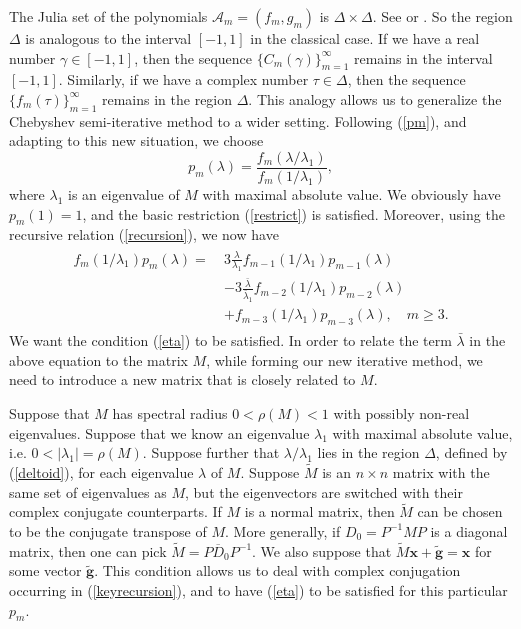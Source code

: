 \documentclass[reqno]{amsart}
\newcommand{\mb}{\mathbf}
\numberwithin{equation}{section}
\theoremstyle{plain}
\theoremstyle{definition}
\begin{document}
The Julia set of the polynomials $\mathcal{A}_m=(f_m,g_m)$ is $\Delta\times \Delta$. See \cite{veselov} or \cite{veselov-survey}. So the region $\Delta$ is analogous to the interval $[-1,1]$ in the classical case. If we have a real number $\gamma\in [-1,1]$, then the sequence $\{C_m(\gamma)\}_{m=1}^\infty$ remains in the interval $[-1,1]$. Similarly, if we have a complex number $\tau\in\Delta$, then the sequence $\{f_m(\tau)\}_{m=1}^\infty$ remains in the region $\Delta$. This analogy allows us to generalize the Chebyshev semi-iterative method to a wider setting. Following (\ref{pm}), and adapting to this new situation, we choose
\[p_m(\lambda) = \frac{f_m(\lambda/\lambda_1)}{f_m(1/\lambda_1)},\]
where $\lambda_1$ is an eigenvalue of $M$ with maximal absolute value. We obviously have $p_m(1)=1$, and the basic restriction (\ref{restrict}) is satisfied. Moreover, using the recursive relation (\ref{recursion}), we now have
\begin{align}\label{keyrecursion}
	\begin{split}	
		f_m(1/\lambda_1)p_m(\lambda) =\ & 3 \frac{\lambda}{\lambda_1} f_{m-1}(1/\lambda_1)p_{m-1}(\lambda)\\
		&-3\frac{\bar{\lambda}}{\bar{\lambda}_1} f_{m-2}(1/\lambda_1)p_{m-2}(\lambda)\\
		&+f_{m-3}(1/\lambda_1)p_{m-3}(\lambda), \quad m\geq 3.
	\end{split}	
\end{align}
We want the condition (\ref{eta}) to be satisfied. In order to relate the term $\bar{\lambda}$ in the above equation to the matrix $M$, while forming our new iterative method, we need to introduce a new matrix that is closely related to $M$.

Suppose that $M$ has spectral radius $0<\rho(M)<1$ with possibly non-real eigenvalues. Suppose that we know an eigenvalue $\lambda_1$ with maximal absolute value, i.e. $0<|\lambda_1|=\rho(M)$. Suppose further that $\lambda/\lambda_1$ lies in the region $\Delta$, defined by (\ref{deltoid}), for each eigenvalue $\lambda$ of $M$. Suppose $\widetilde{M}$ is an $n\times n$ matrix with the same set of eigenvalues as $M$, but the eigenvectors are switched with their complex conjugate counterparts. If $M$ is a normal matrix, then $\widetilde{M}$ can be chosen to be the conjugate transpose of $M$. More generally, if $D_0=P^{-1}MP$ is a diagonal matrix, then one can pick $\widetilde{M} = P \overline{D}_0 P^{-1}$. We also suppose that $\widetilde{M}\mb{x} + \widetilde{\mb{g}}=\mb{x}$ for some vector $\widetilde{\mb{g}}$. This condition allows us to deal with complex conjugation occurring in (\ref{keyrecursion}), and to have (\ref{eta}) to be satisfied for this particular $p_m$. 
\end{document}
